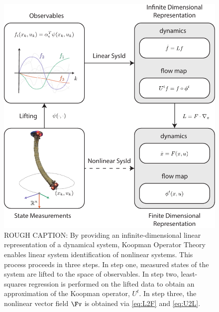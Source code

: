 \begin{figure}[t]
    \centering
    \includegraphics[width=\linewidth]{figures/overviewDiagram_v18.pdf}
    \caption{ROUGH CAPTION: 
    By providing an infinite-dimensional linear representation of a dynamical system, Koopman Operator Theory enables linear system identification of nonlinear systems. 
    This process proceeds in three steps.
    In step one, measured states of the system are lifted to the space of observables.
    In step two, least-squares regression is performed on the lifted data to obtain an approximation of the Koopman operator, $U^t$.
    In step three, the nonlinear vector field $\Fv$ is obtained via \eqref{eq:L2F} and \eqref{eq:U2L}.}
    \label{fig:overview}
\end{figure}

